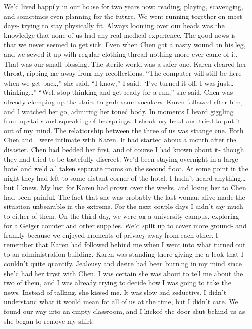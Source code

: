 \documentclass[a4paper]{article}
\begin{document}
We’d lived happily in our house for two years now: reading, playing, scavenging, and sometimes even planning for the future. We went running together on most days- trying to stay physically fit. Always looming over our heads was the knowledge that none of us had any real medical experience.
The good news is that we never seemed to get sick. Even when Chen got a nasty wound on his leg, and we sewed it up with regular clothing thread nothing more ever came of it. That was our small blessing. The sterile world was a safer one.
Karen cleared her throat, ripping me away from my recollections. “The computer will still be here when we get back,” she said.
“I know,” I said. “I’ve turned it off. I was just… thinking…”
“Well stop thinking and get ready for a run,” she said.
Chen was already clomping up the stairs to grab some sneakers. Karen followed after him, and I watched her go, admiring her toned body. In moments I heard giggling from upstairs and squeaking of bedsprings. I shook my head and tried to put it out of my mind.
The relationship between the three of us was strange one. Both Chen and I were intimate with Karen. It had started about a month after the disaster.
Chen had bedded her first, and of course I had known about it- though they had tried to be tastefully discreet. We’d been staying overnight in a large hotel and we’d all taken separate rooms on the second floor. At some point in the night they had left to some distant corner of the hotel. I hadn’t heard anything… but I knew.
My lust for Karen had grown over the weeks, and losing her to Chen had been painful. The fact that she was probably the last woman alive made the situation unbearable in the extreme. For the next couple days I didn’t say much to either of them.
On the third day, we were on a university campus, exploring for a Geiger counter and other supplies. We’d split up to cover more ground- and frankly because we enjoyed moments of privacy away from each other.
I remember that Karen had followed behind me when I went into what turned out to an administration building. Karen was standing there giving me a look that I couldn’t quite quantify. Jealousy and desire had been burning in my mind since she’d had her tryst with Chen. I was certain she was about to tell me about the two of them, and I was already trying to decide how I was going to take the news.
Instead of talking, she kissed me. It was slow and seductive. I didn’t understand what it would mean for all of us at the time, but I didn’t care. We found our way into an empty classroom, and I kicked the door shut behind us as she began to remove my shirt.
\end{document}

